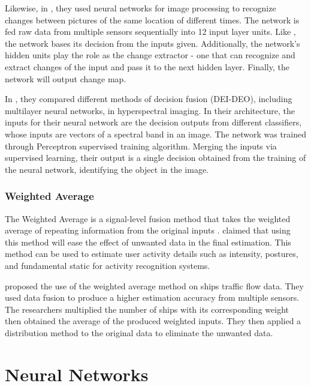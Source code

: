 Likewise, in , they used neural networks for image processing to recognize changes between pictures of the same location of different times. The network is fed raw data from multiple sensors sequentially into 12 input layer units. Like , the network bases its decision from the inputs given. Additionally, the network’s hidden units play the role as the change extractor - one that can recognize and extract changes of the input and pass it to the next hidden layer. Finally, the network will output change map. 

In , they compared different methods of decision fusion (DEI-DEO), including multilayer neural networks, in hyperspectral imaging. In their architecture, the inputs for their neural network are the decision outputs from different classifiers, whose inputs are vectors of a spectral band in an image. The network was trained through Perceptron supervised training algorithm. Merging the inputs via supervised learning, their output is a single decision obtained from the training of the neural network, identifying the object in the image. 

\subsubsection{Weighted Average}
The Weighted Average is a signal-level fusion method that takes the weighted average of repeating information from the original inputs .  claimed that using this method will ease the effect of unwanted data in the final estimation. This method can be used to estimate user activity details such as intensity, postures, and fundamental static for activity recognition systems. 

 proposed the use of the weighted average method on ships traffic flow data. They used data fusion to produce a higher estimation accuracy from multiple sensors. The researchers multiplied the number of ships with its corresponding weight then obtained the average of the produced weighted inputs. They then applied a distribution method to the original data to eliminate the unwanted data. 



\section{Neural Networks}

